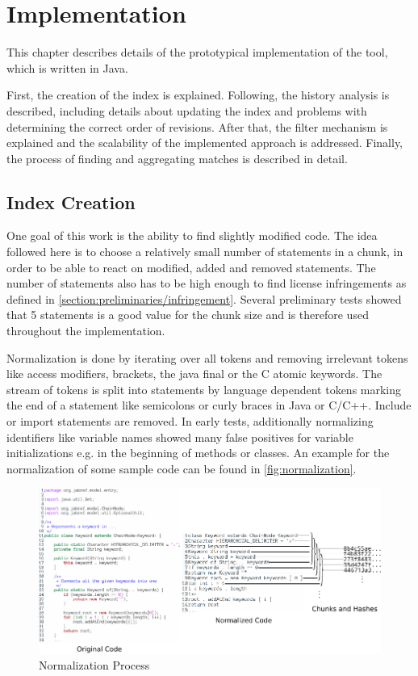 
\chapter{Implementation}\label{chapter:implementation}
This chapter describes details of the prototypical implementation of the tool, which is written in Java.

First, the creation of the index is explained.
Following, the history analysis is described, including details about updating the index and problems with determining the correct order of revisions.
After that, the filter mechanism is explained and the scalability of the implemented approach is addressed.
Finally, the process of finding and aggregating matches is described in detail.

\section{Index Creation}\label{section:implementation/index_creation}
One goal of this work is the ability to find slightly modified code.
The idea followed here is to choose a relatively small number of statements in a chunk, in order to be able to react on modified, added and removed statements.
The number of statements also has to be high enough to find license infringements as defined in \autoref{section:preliminaries/infringement}.
Several preliminary tests showed that 5 statements is a good value for the chunk size and is therefore used throughout the implementation.

Normalization is done by iterating over all tokens and removing irrelevant tokens like access modifiers, brackets, the java final or the C atomic keywords.
The stream of tokens is split into statements by language dependent tokens marking the end of a statement like semicolons or curly braces in Java or C/C++.
Include or import statements are removed.
In early tests, additionally normalizing identifiers like variable names showed many false positives for variable initializations e.g. in the beginning of methods or classes.
An example for the normalization of some sample code can be found in \autoref{fig:normalization}.

\begin{figure}[h]
	\centering
	\includegraphics[width=\linewidth]{figures/normalization.pdf}
	\caption{Normalization Process}\label{fig:normalization}
\end{figure}

